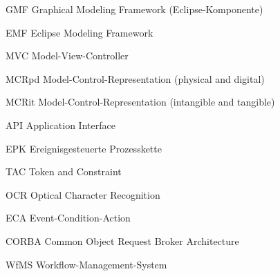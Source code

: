{GMF}
{Graphical Modeling Framework (Eclipse-Komponente)}

{EMF}
{Eclipse Modeling Framework}

{MVC}
{Model-View-Controller}

{MCRpd}
{Model-Control-Representation (physical and digital)}

{MCRit}
{Model-Control-Representation (intangible and tangible)}

{API}
{Application Interface}

{EPK}
{Ereignisgesteuerte Prozesskette}

{TAC}
{Token and Constraint}

{OCR}
{Optical Character Recognition}

{ECA}
{Event-Condition-Action}

{CORBA}
{Common Object Request Broker Architecture}

{WfMS}
{Workflow-Management-System}
